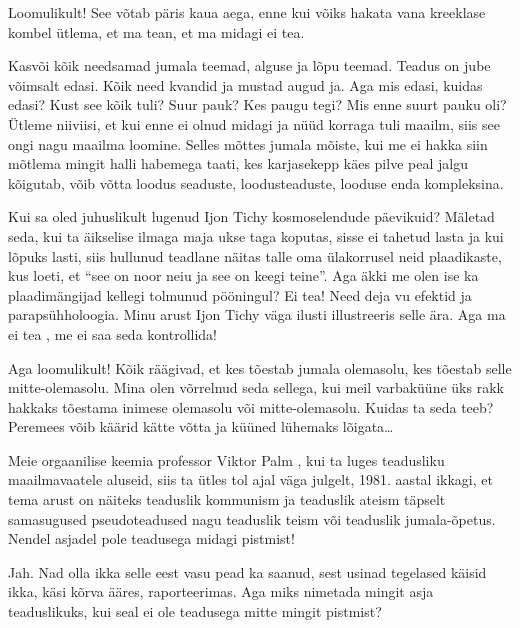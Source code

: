
Loomulikult! See võtab päris kaua aega, enne kui võiks hakata vana kreeklase 
kombel ütlema, et ma tean, et ma midagi ei tea. 

Kasvõi kõik needsamad jumala teemad, alguse ja lõpu teemad. Teadus on jube 
võimsalt edasi. Kõik need kvandid ja mustad augud ja. Aga mis edasi, kuidas 
edasi? Kust see kõik tuli? Suur pauk? Kes paugu tegi? Mis enne suurt pauku oli? 
Ütleme niiviisi, et kui enne ei olnud midagi ja  nüüd korraga tuli maailm, siis 
see ongi nagu maailma loomine. Selles mõttes jumala mõiste, kui me ei hakka 
siin  mõtlema mingit halli habemega taati, kes karjasekepp käes pilve peal 
jalgu kõigutab, võib võtta loodus seaduste, loodusteaduste, looduse enda 
kompleksina. 

Kui sa oled juhuslikult lugenud Ijon Tichy kosmoselendude 
päevikuid? Mäletad seda, 
kui ta  äikselise ilmaga maja ukse taga koputas, sisse ei tahetud lasta ja kui 
lõpuks lasti, siis hullunud teadlane näitas talle oma ülakorrusel neid 
plaadikaste, kus loeti, et \enquote{see on noor neiu ja see on keegi teine}. 
Aga äkki me olen ise ka plaadimängijad kellegi tolmunud pööningul? Ei tea! Need 
deja vu efektid ja  parapsühholoogia. Minu arust Ijon Tichy väga ilusti 
illustreeris selle ära. Aga ma ei tea , me ei saa seda kontrollida! 


Aga loomulikult! Kõik räägivad, et kes tõestab jumala olemasolu, kes tõestab 
selle mitte-olemasolu. Mina olen võrrelnud seda sellega, kui meil varbaküüne 
üks rakk hakkaks tõestama inimese olemasolu või mitte-olemasolu. Kuidas ta seda 
teeb? Peremees võib käärid kätte võtta ja küüned lühemaks lõigata\ldots

Meie orgaanilise keemia professor Viktor Palm , kui ta 
luges  teadusliku maailmavaatele aluseid, siis ta ütles tol ajal väga julgelt,  
1981. aastal ikkagi, et tema arust on näiteks teaduslik kommunism ja teaduslik 
ateism täpselt samasugused pseudoteadused nagu teaduslik teism või teaduslik 
jumala-õpetus. Nendel asjadel pole teadusega midagi pistmist!
                 

Jah. Nad olla ikka selle eest vasu pead ka saanud, sest usinad tegelased käisid 
ikka, käsi kõrva ääres, raporteerimas. Aga miks nimetada mingit asja 
teaduslikuks, kui seal ei ole teadusega mitte mingit pistmist?
                 
